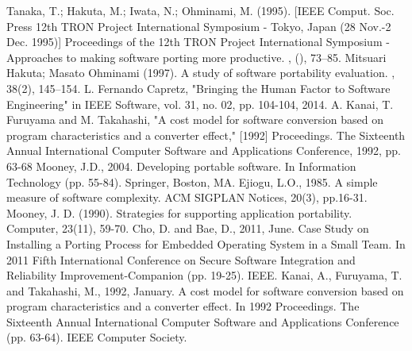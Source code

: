 \documentclass[conference]{IEEEtran}
\begin{document}
\begin{thebibliography}{00}
 Tanaka, T.; Hakuta, M.; Iwata, N.; Ohminami, M. (1995). [IEEE Comput. Soc. Press 12th TRON Project International Symposium - Tokyo, Japan (28 Nov.-2 Dec. 1995)] Proceedings of the 12th TRON Project International Symposium - Approaches to making software porting more productive. , (), 73–85.
 Mitsuari Hakuta; Masato Ohminami (1997). A study of software portability evaluation. , 38(2), 145–154.
 L. Fernando Capretz, "Bringing the Human Factor to Software Engineering" in IEEE Software, vol. 31, no. 02, pp. 104-104, 2014.
 A. Kanai, T. Furuyama and M. Takahashi, "A cost model for software conversion based on program characteristics and a converter effect," [1992] Proceedings. The Sixteenth Annual International Computer Software and Applications Conference, 1992, pp. 63-68
 Mooney, J.D., 2004. Developing portable software. In Information Technology (pp. 55-84). Springer, Boston, MA.
 Ejiogu, L.O., 1985. A simple measure of software complexity. ACM SIGPLAN Notices, 20(3), pp.16-31.
 Mooney, J. D. (1990). Strategies for supporting application portability. Computer, 23(11), 59-70.
 Cho, D. and Bae, D., 2011, June. Case Study on Installing a Porting Process for Embedded Operating System in a Small Team. In 2011 Fifth International Conference on Secure Software Integration and Reliability Improvement-Companion (pp. 19-25). IEEE.
 Kanai, A., Furuyama, T. and Takahashi, M., 1992, January. A cost model for software conversion based on program characteristics and a converter effect. In 1992 Proceedings. The Sixteenth Annual International Computer Software and Applications Conference (pp. 63-64). IEEE Computer Society.
\end{thebibliography}
\end{document}

